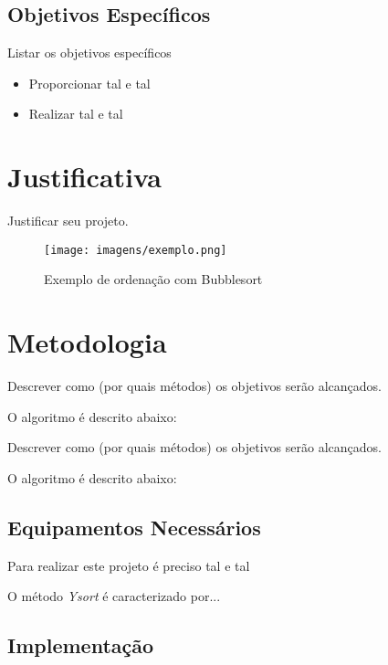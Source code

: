 \documentclass[a4paper,10pt]{article}  %
\begin{document}
\subsection{Objetivos Específicos}

Listar os objetivos específicos

\begin{itemize}
 \item Proporcionar tal e tal
 \item Realizar tal e tal
\end{itemize}


\section{Justificativa}

Justificar seu projeto.

\begin{figure}[ht]
\centering
\texttt{[image: imagens/exemplo.png]}
\caption{Exemplo de ordenação com Bubblesort}
\label{fig:xsort}
\end{figure}


\section{Metodologia}

Descrever como (por quais métodos) os objetivos serão alcançados.

O algoritmo é descrito abaixo:

Descrever como (por quais métodos) os objetivos serão alcançados.

O algoritmo é descrito abaixo:

\subsection{Equipamentos Necessários}


Para realizar este projeto é preciso tal e tal

O método \emph{Ysort} é caracterizado por...

\subsection{Implementação}
\end{document}
